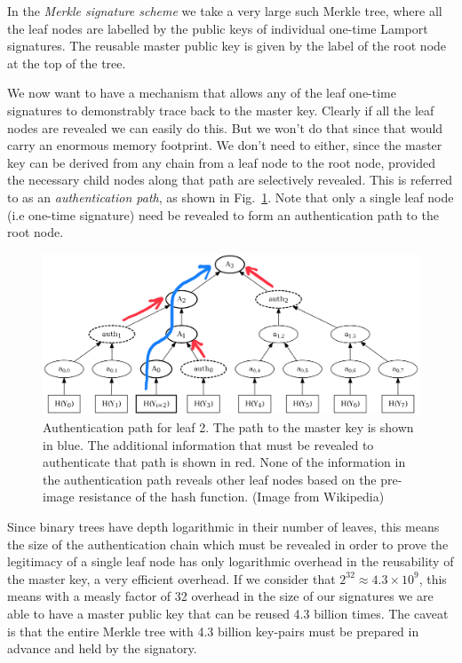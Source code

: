In the \emph{Merkle signature scheme} we take a very large such Merkle tree, where all the leaf nodes are labelled by the public keys of individual one-time Lamport signatures. The reusable master public key is given by the label of the root node at the top of the tree.

We now want to have a mechanism that allows any of the leaf one-time signatures to demonstrably trace back to the master key. Clearly if all the leaf nodes are revealed we can easily do this. But we won't do that since that would carry an enormous memory footprint. We don't need to either, since the master key can be derived from any chain from a leaf node to the root node, provided the necessary child nodes along that path are selectively revealed. This is referred to as an \emph{authentication path}, as shown in Fig.~\ref{fig:auth_path}. Note that only a single leaf node (i.e one-time signature) need be revealed to form an authentication path to the root node.

\begin{figure}[!htb]
	\centering
	\includegraphics[width=\columnwidth]{figures/Authentication_path}
	\caption{Authentication path for leaf 2. The path to the master key is shown in blue. The additional information that must be revealed to authenticate that path is shown in red. None of the information in the authentication path reveals other leaf nodes based on the pre-image resistance of the hash function. (Image from Wikipedia)} \label{fig:auth_path}
\end{figure}

Since binary trees have depth logarithmic in their number of leaves, this means the size of the authentication chain which must be revealed in order to prove the legitimacy of a single leaf node has only logarithmic overhead in the reusability of the master key, a very efficient overhead. If we consider that $2^{32}\approx 4.3\times 10^9$, this means with a measly factor of 32 overhead in the size of our signatures we are able to have a master public key that can be reused 4.3 billion times. The caveat is that the entire Merkle tree with 4.3 billion key-pairs must be prepared in advance and held by the signatory.

